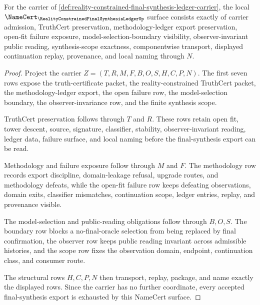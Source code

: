 \begin{theorem}
\label{thm:reality-constrained-final-synthesis-ledger-obligations}
For the carrier of \autoref{def:reality-constrained-final-synthesis-ledger-carrier}, the local $\NameCert_{\RealityConstrainedFinalSynthesisLedgerUp}$ surface consists exactly of carrier admission, TruthCert preservation, methodology-ledger export preservation, open-fit failure exposure, model-selection-boundary visibility, observer-invariant public reading, synthesis-scope exactness, componentwise transport, displayed continuation replay, provenance, and local naming through $N$.
\end{theorem}
\begin{proof}
Project the carrier $Z=(T,R,M,F,B,O,S,H,C,P,N)$. The first seven rows expose the truth-certificate packet, the reality-constrained TruthCert packet, the methodology-ledger export, the open failure row, the model-selection boundary, the observer-invariance row, and the finite synthesis scope.

TruthCert preservation follows through $T$ and $R$. These rows retain open fit, tower descent, source, signature, classifier, stability, observer-invariant reading, ledger data, failure surface, and local naming before the final-synthesis export can be read.

Methodology and failure exposure follow through $M$ and $F$. The methodology row records export discipline, domain-leakage refusal, upgrade routes, and methodology defeats, while the open-fit failure row keeps defeating observations, domain exits, classifier mismatches, continuation scope, ledger entries, replay, and provenance visible.

The model-selection and public-reading obligations follow through $B,O,S$. The boundary row blocks a no-final-oracle selection from being replaced by final confirmation, the observer row keeps public reading invariant across admissible histories, and the scope row fixes the observation domain, endpoint, continuation class, and consumer route.

The structural rows $H,C,P,N$ then transport, replay, package, and name exactly the displayed rows. Since the carrier has no further coordinate, every accepted final-synthesis export is exhausted by this NameCert surface.
\end{proof}

